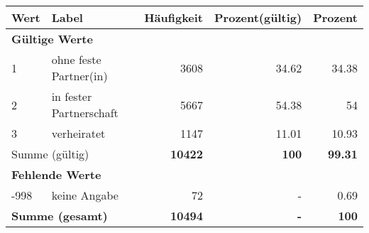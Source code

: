      \begin{longtable}{lXrrr}
     \toprule
     \textbf{Wert} & \textbf{Label} & \textbf{Häufigkeit} & \textbf{Prozent(gültig)} & \textbf{Prozent} \\
     \endhead
     \midrule
     \multicolumn{5}{l}{\textbf{Gültige Werte}}\\

     1 &
     \multicolumn{1}{X}{ ohne feste Partner(in)   } &


       \num{3608} &
       \num[round-mode=places,round-precision=2]{34.62} &
         \num[round-mode=places,round-precision=2]{34.38} \\

     2 &
     \multicolumn{1}{X}{ in fester Partnerschaft   } &


       \num{5667} &
       \num[round-mode=places,round-precision=2]{54.38} &
         \num[round-mode=places,round-precision=2]{54} \\

     3 &
     \multicolumn{1}{X}{ verheiratet   } &


       \num{1147} &
       \num[round-mode=places,round-precision=2]{11.01} &
         \num[round-mode=places,round-precision=2]{10.93} \\
     \midrule
     \multicolumn{2}{l}{Summe (gültig)} &
       \textbf{\num{10422}} &
     \textbf{\num{100}} &
       \textbf{\num[round-mode=places,round-precision=2]{99.31}} \\
     \multicolumn{5}{l}{\textbf{Fehlende Werte}}\\
       -998 &
       keine Angabe &
         \num{72} &
        - &
         \num[round-mode=places,round-precision=2]{0.69} \\
     \midrule
     \multicolumn{2}{l}{\textbf{Summe (gesamt)}} &
          \textbf{\num{10494}} &
        \textbf{-} &
        \textbf{\num{100}} \\
     \bottomrule
     \end{longtable}
     
